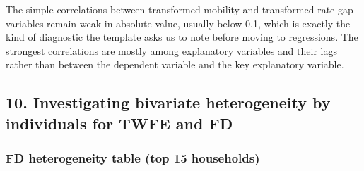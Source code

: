 \documentclass[a4paper,11pt]{article}
\renewcommand{\_}{\textunderscore\allowbreak}
\begin{document}
The simple correlations between transformed mobility and transformed
rate-gap variables remain weak in absolute value, usually below 0.1,
which is exactly the kind of diagnostic the template asks us to note
before moving to regressions. The strongest correlations are mostly
among explanatory variables and their lags rather than between the
dependent variable and the key explanatory variable.

\hypertarget{investigating-bivariate-heterogeneity-by-individuals-for-twfe-and-fd}{%
\subsection{10. Investigating bivariate heterogeneity by individuals for
TWFE and
FD}\label{investigating-bivariate-heterogeneity-by-individuals-for-twfe-and-fd}}

\hypertarget{fd-heterogeneity-table-top-15-households}{%
\subsubsection{FD heterogeneity table (top 15
households)}\label{fd-heterogeneity-table-top-15-households}}
\end{document}
